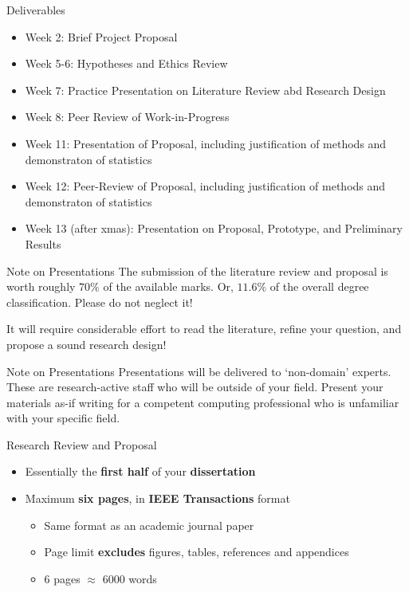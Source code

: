 \begin{frame}{Deliverables}
	\begin{itemize}
		\pause\item Week 2: Brief Project Proposal
		\pause\item Week 5-6: Hypotheses and Ethics Review
		\pause\item Week 7: Practice Presentation on Literature Review abd Research Design
		\pause\item Week 8: Peer Review of Work-in-Progress
		\pause\item Week 11: Presentation of Proposal, including justification of methods and demonstraton of statistics
		\pause\item Week 12: Peer-Review of Proposal, including justification of methods and demonstraton of statistics
		\pause\item Week 13 (after xmas): Presentation on Proposal, Prototype, and Preliminary Results
	\end{itemize}
\end{frame}

\begin{frame}{Note on Presentations}
	The submission of the literature review and proposal is worth roughly \textbf{$70\%$} of the available marks. Or, $11.6\%$ of the overall degree classification. Please do not neglect it! 
	
	\vspace{2em}
	
	It will require considerable effort to read the literature, refine your question, and propose a sound research design!
\end{frame}

\begin{frame}{Note on Presentations}
	Presentations will be delivered to `non-domain' experts. These are research-active staff who will be outside of your field. Present your materials as-if writing for a competent computing professional who is unfamiliar with your specific field.
\end{frame}

\begin{frame}{Research Review and Proposal}
	\begin{itemize}
		\pause\item Essentially the \textbf{first half} of your \textbf{dissertation}
		\pause\item Maximum \textbf{six pages}, in \textbf{IEEE Transactions} format
			\begin{itemize}
				\pause\item Same format as an academic journal paper
				\pause\item Page limit \textbf{excludes} figures, tables, references and appendices
				\pause\item 6 pages $\approx$ 6000 words
			\end{itemize}
	\end{itemize}
\end{frame}

